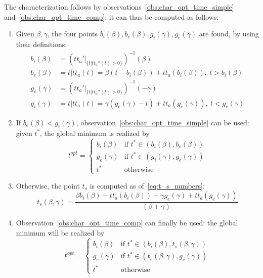 The characterization follows by observations~\ref{obs:char_opt_time_simple} and~\ref{obs:char_opt_time_comp}:
it can thus be computed as follows:
\begin{enumerate}
\item Given \(\beta, \gamma\), the four points \(b_i(\beta), b_e(\beta), g_i(\gamma), g_e(\gamma)\) are found, by using their definitions:
  \begin{equation}
    \label{eq:def_b_ieg_ie}
    \begin{split}
      b_i(\beta) & = (tt_a'|_{\{t | tt_a''(t) > 0\}})^{-1}(\beta) \\
      b_e(\beta) & = t | tt_a(t) = \beta (t - b_i(\beta)) + tt_a(b_i(\beta)),\ t > b_i(\beta) \\
      g_e(\gamma) & = (tt_a'|_{\{t | tt_a''(t) > 0\}})^{-1}(-\gamma) \\
      g_i(\gamma) & = t | tt_a(t) = \gamma (g_e(\gamma) - t) + tt_a(g_e(\gamma)),\ t < g_e(\gamma)
    \end{split}
  \end{equation}
\item If \(b_e(\beta) < g_i(\gamma)\), observation~\ref{obs:char_opt_time_simple} can be used:
  given \(t^*\), the global minimum is realized by
    \begin{equation*}
    t^{opt} =
    \begin{cases}
      b_i(\beta) & \text{if } t^*\in(b_i(\beta), b_e(\beta)) \\
      g_e(\gamma) & \text{if } t^*\in(g_i(\gamma), g_e(\gamma)) \\
      t^* & \text{otherwise}
    \end{cases}
  \end{equation*}
\item Otherwise, the point \(t_s\) is computed as of~\eqref{eq:t_s_numbers}:
  \begin{equation*}
    t_s(\beta, \gamma) = \frac{\beta b_i(\beta) - tt_a(b_i(\beta)) + \gamma g_e(\gamma) + tt_a(g_e(\gamma))}{(\beta + \gamma)}
  \end{equation*}
\item Observation~\ref{obs:char_opt_time_comp} can finally be used:
  the global minimum will be realized by
  \begin{equation*}
    t^{opt} =
    \begin{cases}
      b_i(\beta) & \text{if } t^*\in(b_i(\beta), t_s(\beta, \gamma)) \\
      g_e(\gamma) & \text{if } t^*\in(t_s(\beta, \gamma), g_e(\gamma)) \\
      t^* & \text{otherwise}
    \end{cases}
  \end{equation*}
\end{enumerate}

